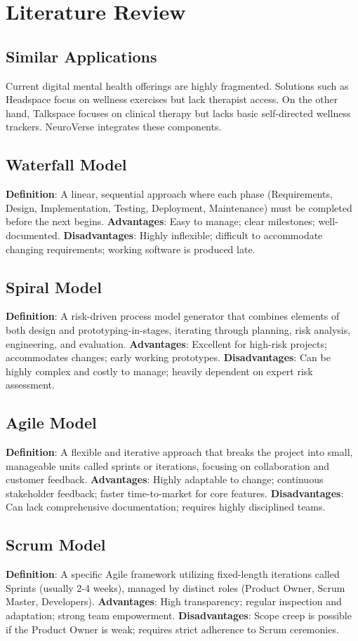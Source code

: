 \documentclass[a4paper,11pt]{report}
\begin{document}
\section{Literature Review}
\subsection{Similar Applications}
Current digital mental health offerings are highly fragmented. Solutions such as Headspace focus on wellness exercises but lack therapist access. On the other hand, Talkspace focuses on clinical therapy but lacks basic self-directed wellness trackers. NeuroVerse integrates these components.

\subsection{Waterfall Model}
\textbf{Definition}: A linear, sequential approach where each phase (Requirements, Design, Implementation, Testing, Deployment, Maintenance) must be completed before the next begins.
\textbf{Advantages}: Easy to manage; clear milestones; well-documented.
\textbf{Disadvantages}: Highly inflexible; difficult to accommodate changing requirements; working software is produced late.

\subsection{Spiral Model}
\textbf{Definition}: A risk-driven process model generator that combines elements of both design and prototyping-in-stages, iterating through planning, risk analysis, engineering, and evaluation.
\textbf{Advantages}: Excellent for high-risk projects; accommodates changes; early working prototypes.
\textbf{Disadvantages}: Can be highly complex and costly to manage; heavily dependent on expert risk assessment.

\subsection{Agile Model}
\textbf{Definition}: A flexible and iterative approach that breaks the project into small, manageable units called sprints or iterations, focusing on collaboration and customer feedback.
\textbf{Advantages}: Highly adaptable to change; continuous stakeholder feedback; faster time-to-market for core features.
\textbf{Disadvantages}: Can lack comprehensive documentation; requires highly disciplined teams.

\subsection{Scrum Model}
\textbf{Definition}: A specific Agile framework utilizing fixed-length iterations called Sprints (usually 2-4 weeks), managed by distinct roles (Product Owner, Scrum Master, Developers).
\textbf{Advantages}: High transparency; regular inspection and adaptation; strong team empowerment.
\textbf{Disadvantages}: Scope creep is possible if the Product Owner is weak; requires strict adherence to Scrum ceremonies.
\end{document}

